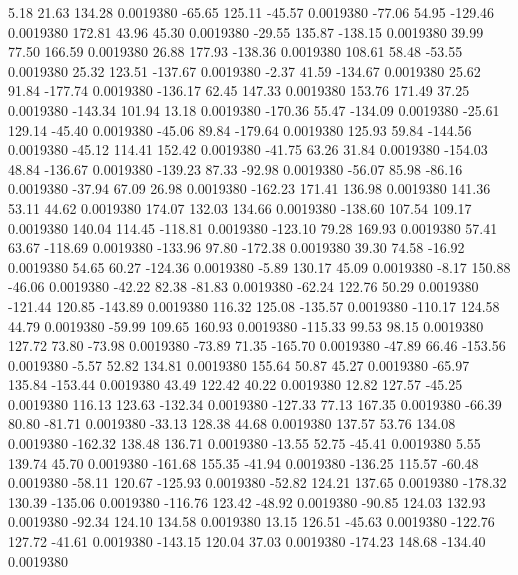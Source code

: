     5.18   21.63  134.28   0.0019380
  -65.65  125.11  -45.57   0.0019380
  -77.06   54.95 -129.46   0.0019380
  172.81   43.96   45.30   0.0019380
  -29.55  135.87 -138.15   0.0019380
   39.99   77.50  166.59   0.0019380
   26.88  177.93 -138.36   0.0019380
  108.61   58.48  -53.55   0.0019380
   25.32  123.51 -137.67   0.0019380
   -2.37   41.59 -134.67   0.0019380
   25.62   91.84 -177.74   0.0019380
 -136.17   62.45  147.33   0.0019380
  153.76  171.49   37.25   0.0019380
 -143.34  101.94   13.18   0.0019380
 -170.36   55.47 -134.09   0.0019380
  -25.61  129.14  -45.40   0.0019380
  -45.06   89.84 -179.64   0.0019380
  125.93   59.84 -144.56   0.0019380
  -45.12  114.41  152.42   0.0019380
  -41.75   63.26   31.84   0.0019380
 -154.03   48.84 -136.67   0.0019380
 -139.23   87.33  -92.98   0.0019380
  -56.07   85.98  -86.16   0.0019380
  -37.94   67.09   26.98   0.0019380
 -162.23  171.41  136.98   0.0019380
  141.36   53.11   44.62   0.0019380
  174.07  132.03  134.66   0.0019380
 -138.60  107.54  109.17   0.0019380
  140.04  114.45 -118.81   0.0019380
 -123.10   79.28  169.93   0.0019380
   57.41   63.67 -118.69   0.0019380
 -133.96   97.80 -172.38   0.0019380
   39.30   74.58  -16.92   0.0019380
   54.65   60.27 -124.36   0.0019380
   -5.89  130.17   45.09   0.0019380
   -8.17  150.88  -46.06   0.0019380
  -42.22   82.38  -81.83   0.0019380
  -62.24  122.76   50.29   0.0019380
 -121.44  120.85 -143.89   0.0019380
  116.32  125.08 -135.57   0.0019380
 -110.17  124.58   44.79   0.0019380
  -59.99  109.65  160.93   0.0019380
 -115.33   99.53   98.15   0.0019380
  127.72   73.80  -73.98   0.0019380
  -73.89   71.35 -165.70   0.0019380
  -47.89   66.46 -153.56   0.0019380
   -5.57   52.82  134.81   0.0019380
  155.64   50.87   45.27   0.0019380
  -65.97  135.84 -153.44   0.0019380
   43.49  122.42   40.22   0.0019380
   12.82  127.57  -45.25   0.0019380
  116.13  123.63 -132.34   0.0019380
 -127.33   77.13  167.35   0.0019380
  -66.39   80.80  -81.71   0.0019380
  -33.13  128.38   44.68   0.0019380
  137.57   53.76  134.08   0.0019380
 -162.32  138.48  136.71   0.0019380
  -13.55   52.75  -45.41   0.0019380
    5.55  139.74   45.70   0.0019380
 -161.68  155.35  -41.94   0.0019380
 -136.25  115.57  -60.48   0.0019380
  -58.11  120.67 -125.93   0.0019380
  -52.82  124.21  137.65   0.0019380
 -178.32  130.39 -135.06   0.0019380
 -116.76  123.42  -48.92   0.0019380
  -90.85  124.03  132.93   0.0019380
  -92.34  124.10  134.58   0.0019380
   13.15  126.51  -45.63   0.0019380
 -122.76  127.72  -41.61   0.0019380
 -143.15  120.04   37.03   0.0019380
 -174.23  148.68 -134.40   0.0019380
